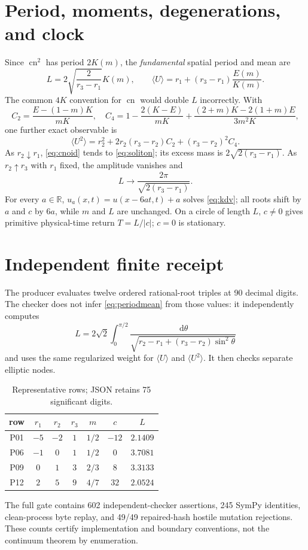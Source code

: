 \documentclass[10pt]{article}
\newcommand{\R}{\mathbb R}
\newcommand{\dd}{\,\mathrm d}
\newcommand{\cn}{\operatorname{cn}}
\begin{document}
\section{Period, moments, degenerations, and clock}
Since $\cn^2$ has period $2K(m)$, the \emph{fundamental} spatial period and
mean are
\begin{equation}
 L=2\sqrt{\frac2{r_3-r_1}}K(m),\qquad
 \langle U\rangle=r_1+(r_3-r_1)\frac{E(m)}{K(m)}.       \label{eq:periodmean}
\end{equation}
The common $4K$ convention for $\cn$ would double $L$ incorrectly.  With
\[
 C_2=\frac{E-(1-m)K}{mK},\quad
 C_4=1-\frac{2(K-E)}{mK}
 +\frac{(2+m)K-2(1+m)E}{3m^2K},
\]
one further exact observable is
\begin{equation}
 \langle U^2\rangle=r_2^2+2r_2(r_3-r_2)C_2+(r_3-r_2)^2C_4. \label{eq:second}
\end{equation}
As $r_2\downarrow r_1$, \eqref{eq:cnoid} tends to \eqref{eq:soliton}; its
excess mass is $2\sqrt{2(r_3-r_1)}$.  As $r_2\uparrow r_3$ with $r_1$ fixed,
the amplitude vanishes and
\[
 L\longrightarrow\frac{2\pi}{\sqrt{2(r_3-r_1)}}.
\]
For every $a\in\R$, $u_a(x,t)=u(x-6at,t)+a$ solves \eqref{eq:kdv}; all roots
shift by $a$ and $c$ by $6a$, while $m$ and $L$ are unchanged.  On a circle
of length $L$, $c\ne0$ gives primitive physical-time return $T=L/|c|$;
$c=0$ is stationary.

\section{Independent finite receipt}
The producer evaluates twelve ordered rational-root triples at 90 decimal
digits.  The checker does not infer \eqref{eq:periodmean} from those values:
it independently computes
\[
 L=2\sqrt2\int_0^{\pi/2}
 \frac{\dd\theta}{\sqrt{r_2-r_1+(r_3-r_2)\sin^2\theta}}
\]
and uses the same regularized weight for $\langle U\rangle$ and
$\langle U^2\rangle$.  It then checks separate elliptic nodes.
\begin{table}[h]
\centering\small
\caption{Representative rows; JSON retains 75 significant digits.}
\begin{tabular}{c|ccc|c|c|c}
\toprule
row & $r_1$ & $r_2$ & $r_3$ & $m$ & $c$ & $L$\\
\midrule
P01 & $-5$ & $-2$ & $1$ & $1/2$ & $-12$ & $2.1409$\\
P06 & $-1$ & $0$ & $1$ & $1/2$ & $0$ & $3.7081$\\
P09 & $0$ & $1$ & $3$ & $2/3$ & $8$ & $3.3133$\\
P12 & $2$ & $5$ & $9$ & $4/7$ & $32$ & $2.0524$\\
\bottomrule
\end{tabular}
\end{table}
The full gate contains 602 independent-checker assertions, 245 SymPy
identities, clean-process byte replay, and 49/49 repaired-hash hostile
mutation rejections.  These counts certify implementation and boundary
conventions, not the continuum theorem by enumeration.
\fi
\end{document}
